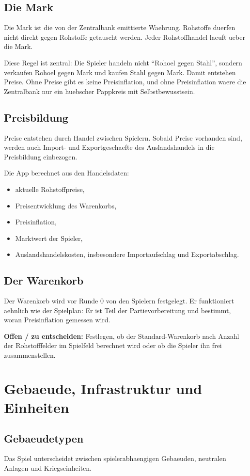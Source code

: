 \documentclass[11pt,a4paper,oneside,parskip=half]{scrreprt}
\newcommand{\offen}[1]{\begin{framed}\noindent\textbf{Offen / zu entscheiden:} #1\end{framed}}
\begin{document}
\section{Die Mark}
Die Mark ist die von der Zentralbank emittierte Waehrung. Rohstoffe duerfen nicht direkt gegen Rohstoffe getauscht werden. Jeder Rohstoffhandel laeuft ueber die Mark.

Diese Regel ist zentral: Die Spieler handeln nicht \enquote{Rohoel gegen Stahl}, sondern verkaufen Rohoel gegen Mark und kaufen Stahl gegen Mark. Damit entstehen Preise. Ohne Preise gibt es keine Preisinflation, und ohne Preisinflation waere die Zentralbank nur ein huebscher Pappkreis mit Selbstbewusstsein.

\section{Preisbildung}
Preise entstehen durch Handel zwischen Spielern. Sobald Preise vorhanden sind, werden auch Import- und Exportgeschaefte des Auslandshandels in die Preisbildung einbezogen.

Die App berechnet aus den Handelsdaten:
\begin{itemize}
  \item aktuelle Rohstoffpreise,
  \item Preisentwicklung des Warenkorbs,
  \item Preisinflation,
  \item Marktwert der Spieler,
  \item Auslandshandelskosten, insbesondere Importaufschlag und Exportabschlag.
\end{itemize}

\section{Der Warenkorb}
Der Warenkorb wird vor Runde 0 von den Spielern festgelegt. Er funktioniert aehnlich wie der Spielplan: Er ist Teil der Partievorbereitung und bestimmt, woran Preisinflation gemessen wird.

\offen{Festlegen, ob der Standard-Warenkorb nach Anzahl der Rohstofffelder im Spielfeld berechnet wird oder ob die Spieler ihn frei zusammenstellen.}

\chapter{Gebaeude, Infrastruktur und Einheiten}

\section{Gebaeudetypen}
Das Spiel unterscheidet zwischen spielerabhaengigen Gebaeuden, neutralen Anlagen und Kriegseinheiten.
\end{document}

